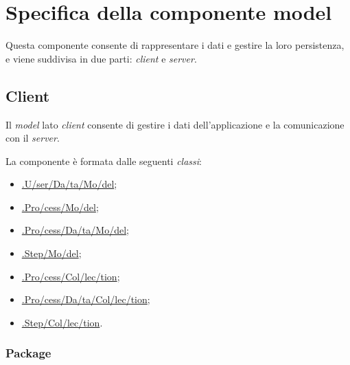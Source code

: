 \section{Specifica della componente model}

Questa componente consente di rappresentare i dati e gestire la loro persistenza, e viene suddivisa in due parti: \textit{client} e \textit{server}. 

\subsection{Client}

Il \textit{model} lato \textit{client} consente di gestire i dati dell'applicazione e la comunicazione con il \textit{server}.

La componente è formata dalle seguenti \textit{classi}:
\begin{itemize}
	\item \hyperref[userDataModel]{\model{}.U\fshyp{}ser\fshyp{}Da\fshyp{}ta\fshyp{}Mo\fshyp{}del};
	\item \hyperref[processModel]{\model{}.Pro\fshyp{}cess\fshyp{}Mo\fshyp{}del};
	\item \hyperref[processDataModel]{\model{}.Pro\fshyp{}cess\fshyp{}Da\fshyp{}ta\fshyp{}Mo\fshyp{}del};
	\item \hyperref[stepModel]{\model{}.Step\fshyp{}Mo\fshyp{}del};
	\item \hyperref[processCollection]{\collection{}.Pro\fshyp{}cess\fshyp{}Col\fshyp{}lec\fshyp{}tion};
	\item \hyperref[processDataCollection]{\model{}.Pro\fshyp{}cess\fshyp{}Da\fshyp{}ta\fshyp{}Col\fshyp{}lec\fshyp{}tion};
	\item \hyperref[stepCollection]{\collection{}.Step\fshyp{}Col\fshyp{}lec\fshyp{}tion}.
\end{itemize}

\subsubsection{Package \model{}}

